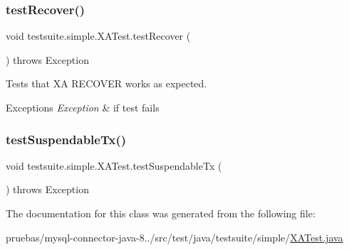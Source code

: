 \subsubsection{\texorpdfstring{test\+Recover()}{testRecover()}}
{\footnotesize\ttfamily void testsuite.\+simple.\+X\+A\+Test.\+test\+Recover (\begin{DoxyParamCaption}{ }\end{DoxyParamCaption}) throws Exception}

Tests that XA R\+E\+C\+O\+V\+ER works as expected.


\begin{DoxyExceptions}{Exceptions}
{\em Exception} & if test fails \\
\hline
\end{DoxyExceptions}
\mbox{\label{classtestsuite_1_1simple_1_1_x_a_test_a81909386fefd2283e02aa376525f6fd7}} 
\subsubsection{\texorpdfstring{test\+Suspendable\+Tx()}{testSuspendableTx()}}
{\footnotesize\ttfamily void testsuite.\+simple.\+X\+A\+Test.\+test\+Suspendable\+Tx (\begin{DoxyParamCaption}{ }\end{DoxyParamCaption}) throws Exception}



The documentation for this class was generated from the following file\+:\begin{DoxyCompactItemize}
\item 
pruebas/mysql-\/connector-\/java-\/8../src/test/java/testsuite/simple/\mbox{\hyperlink{_x_a_test_8java}{X\+A\+Test.\+java}}\end{DoxyCompactItemize}
